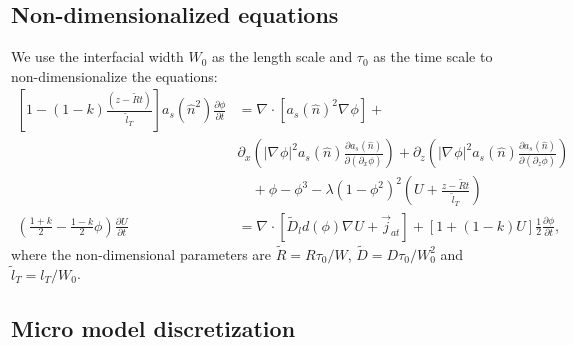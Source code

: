 \documentclass[a4paper,12pt]{article}
\renewcommand{\div}[1]{\nabla_{#1} \cdot}
\newcommand{\grad}[1]{\nabla_{#1}}
\begin{document}
\subsection{Non-dimensionalized equations}
We use  the interfacial width $W_0$ as the length scale and $\tau_0$ as the time scale to non-dimensionalize the equations:
\begin{align}
 \left[1-(1-k) \frac{(z- \tilde{R} t)}{ \tilde{l}_T} \right] a_s(\hat{n}^2) \frac{\partial \phi}{\partial t} &= 
  \div{} [a_s(\hat{n})^2 \grad{} \phi] + \nonumber  \\  
 & \partial_x \left( |\grad{} \phi|^2 a_s(\hat{n}) \frac{\partial a_s(\hat{n})}{\partial (\partial_x \phi)}  \right)  + 
\partial_z \left( |\grad{} \phi|^2 a_s(\hat{n}) \frac{\partial a_s(\hat{n})}{\partial (\partial_z \phi)}  \right)   \nonumber \\
& \quad + \phi - \phi^3 - \lambda (1-\phi^2)^2 \left(U + \frac{z-\tilde{R} t}{ \tilde{l}_T} \right) \\
\left(\frac{1+k}{2}-\frac{1-k}{2}\phi \right) \frac{\partial U}{\partial t} &= \div{} [\tilde{D}_l d(\phi) \grad{} U + \vec{j}_{at}] + [1+(1-k)U]\frac{1}{2}  \frac{\partial \phi}{\partial t},
\end{align}
where the non-dimensional parameters are  $\tilde{R} = R\tau_0 / W$, $\tilde{D} = D \tau_0 / W_0^2$ and $\tilde{l}_T = l_T / W_0$.

\subsection{Micro model discretization}
\end{document}
